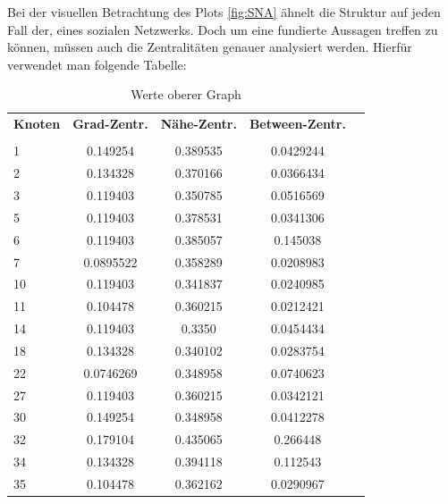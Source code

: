 \FloatBarrier

Bei der visuellen Betrachtung des Plots \ref{fig:SNA} ähnelt die Struktur auf jeden Fall der, eines sozialen Netzwerks. Doch um eine fundierte Aussagen treffen zu können, müssen auch die Zentralitäten genauer analysiert werden. Hierfür verwendet man folgende Tabelle:

\begin{table}[h!]
\footnotesize
\caption{Werte oberer Graph}
\begin{tabular}{lcccc}\toprule 
\textbf{Knoten} &\textbf{Grad-Zentr.} &\textbf{Nähe-Zentr.}  &\textbf{Between-Zentr.} \\
 &\\\midrule
  1 & 0.149254  & 0.389535 & 0.0429244   \\
  2 & 0.134328  & 0.370166 & 0.0366434   \\
  3 & 0.119403  & 0.350785 & 0.0516569   \\
  5 & 0.119403  & 0.378531 & 0.0341306   \\
  6 & 0.119403  & 0.385057 & 0.145038    \\
  7 & 0.0895522 & 0.358289 & 0.0208983   \\
 10 & 0.119403  & 0.341837 & 0.0240985   \\
 11 & 0.104478  & 0.360215 & 0.0212421   \\
 14 & 0.119403  & 0.3350    & 0.0454434   \\
 18 & 0.134328  & 0.340102 & 0.0283754   \\
 22 & 0.0746269 & 0.348958 & 0.0740623   \\
 27 & 0.119403  & 0.360215 & 0.0342121   \\
 30 & 0.149254  & 0.348958 & 0.0412278   \\
 32 & 0.179104  & 0.435065 & 0.266448    \\
 34 & 0.134328  & 0.394118 & 0.112543    \\
 35 & 0.104478  & 0.362162 & 0.0290967   \\
       

\end{tabular}
\end{table}
